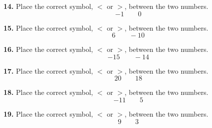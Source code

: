 \documentclass{ximera}
\begin{document}
\begin{problem}
\textbf{14.} Place the correct symbol, $<$ or $>$, between the two numbers.
\[
-1 \qquad 0
\]

\begin{multipleChoice}
\end{multipleChoice}
\end{problem}

\begin{problem}
\textbf{15.} Place the correct symbol, $<$ or $>$, between the two numbers.
\[
6 \qquad -10
\]

\begin{multipleChoice}
\end{multipleChoice}
\end{problem}

\begin{problem}
\textbf{16.} Place the correct symbol, $<$ or $>$, between the two numbers.
\[
-15 \qquad -14
\]

\begin{multipleChoice}
\end{multipleChoice}
\end{problem}

\begin{problem}
\textbf{17.} Place the correct symbol, $<$ or $>$, between the two numbers.
\[
20 \qquad 18
\]

\begin{multipleChoice}
\end{multipleChoice}
\end{problem}

\begin{problem}
\textbf{18.} Place the correct symbol, $<$ or $>$, between the two numbers.
\[
-11 \qquad 5
\]

\begin{multipleChoice}
\end{multipleChoice}
\end{problem}

\begin{problem}
\textbf{19.} Place the correct symbol, $<$ or $>$, between the two numbers.
\[
9 \qquad 3
\]

\begin{multipleChoice}
\end{multipleChoice}
\end{problem}
\end{document}
